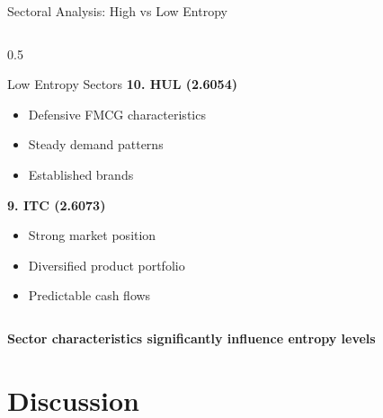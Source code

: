 \documentclass[aspectratio=169,12pt,xcolor=table]{beamer}
\begin{document}
\begin{frame}{Sectoral Analysis: High vs Low Entropy}
\begin{columns}[T]
\begin{column}{0.5\textwidth}
\begin{block}{Low Entropy Sectors}
        \vspace{0.2cm}
        \textbf{10. HUL (2.6054)} \\
        \small
        \begin{itemize}
            \item Defensive FMCG characteristics
            \item Steady demand patterns
            \item Established brands
        \end{itemize}
        
        \vspace{0.2cm}
        \textbf{9. ITC (2.6073)} \\
        \small
        \begin{itemize}
            \item Strong market position
            \item Diversified product portfolio
            \item Predictable cash flows
        \end{itemize}
    \end{block}
\end{column}
\end{columns}

\vspace{0.3cm}
\begin{center}
\textcolor{niftyblue}{\textbf{Sector characteristics significantly influence entropy levels}}
\end{center}
\end{frame}

\section{Discussion}
\end{document}

